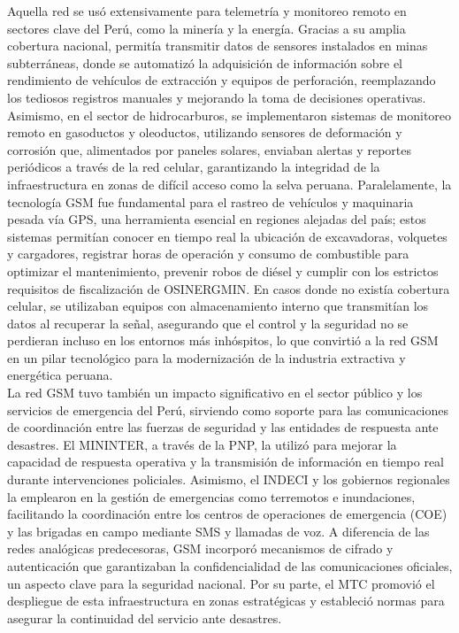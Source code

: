 \documentclass[12pt,a4paper]{article}
\begin{document}
	Aquella red se usó extensivamente para telemetría y monitoreo remoto en sectores clave del Perú, como la minería y la energía. Gracias a su amplia cobertura nacional, permitía transmitir datos de sensores instalados en minas subterráneas, donde se automatizó la adquisición de información sobre el rendimiento de vehículos de extracción y equipos de perforación, reemplazando los tediosos registros manuales y mejorando la toma de decisiones operativas. Asimismo, en el sector de hidrocarburos, se implementaron sistemas de monitoreo remoto en gasoductos y oleoductos, utilizando sensores de deformación y corrosión que, alimentados por paneles solares, enviaban alertas y reportes periódicos a través de la red celular, garantizando la integridad de la infraestructura en zonas de difícil acceso como la selva peruana. Paralelamente, la tecnología GSM fue fundamental para el rastreo de vehículos y maquinaria pesada vía GPS, una herramienta esencial en regiones alejadas del país; estos sistemas permitían conocer en tiempo real la ubicación de excavadoras, volquetes y cargadores, registrar horas de operación y consumo de combustible para optimizar el mantenimiento, prevenir robos de diésel y cumplir con los estrictos requisitos de fiscalización de OSINERGMIN. En casos donde no existía cobertura celular, se utilizaban equipos con almacenamiento interno que transmitían los datos al recuperar la señal, asegurando que el control y la seguridad no se perdieran incluso en los entornos más inhóspitos, lo que convirtió a la red GSM en un pilar tecnológico para la modernización de la industria extractiva y energética peruana. \\
	
	La red GSM tuvo también un impacto significativo en el sector público y los servicios de emergencia del Perú, sirviendo como soporte para las comunicaciones de coordinación entre las fuerzas de seguridad y las entidades de respuesta ante desastres. El MININTER, a través de la PNP, la utilizó para mejorar la capacidad de respuesta operativa y la transmisión de información en tiempo real durante intervenciones policiales. Asimismo, el INDECI y los gobiernos regionales la emplearon en la gestión de emergencias como terremotos e inundaciones, facilitando la coordinación entre los centros de operaciones de emergencia (COE) y las brigadas en campo mediante SMS y llamadas de voz. A diferencia de las redes analógicas predecesoras, GSM incorporó mecanismos de cifrado y autenticación que garantizaban la confidencialidad de las comunicaciones oficiales, un aspecto clave para la seguridad nacional. Por su parte, el MTC promovió el despliegue de esta infraestructura en zonas estratégicas y estableció normas para asegurar la continuidad del servicio ante desastres. \\
	
\end{document}
